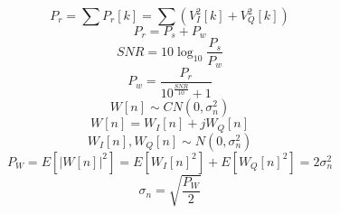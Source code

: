 \documentclass{article}
\begin{document}
$$P_r = \sum P_r[k] = \sum \left( V_I^2[k] + V_Q^2[k] \right)$$
$$P_r = P_s + P_w$$
$$SNR = 10 \log_{10} \frac{P_s}{P_w}$$
$$P_w = \frac{P_r}{10^{\frac{SNR}{10}} + 1}$$
$$W[n] \sim CN(0, \sigma_n^2)$$
$$W[n] = W_I[n] + j W_Q[n]$$
$$W_I[n], W_Q[n] \sim N(0, \sigma_n^2)$$
$$P_W = E[|W[n]|^2] = E[W_I[n]^2] + E[W_Q[n]^2] = 2 \sigma_n^2$$
$$\sigma_n = \sqrt{\frac{P_W}{2}}$$
\end{document}
